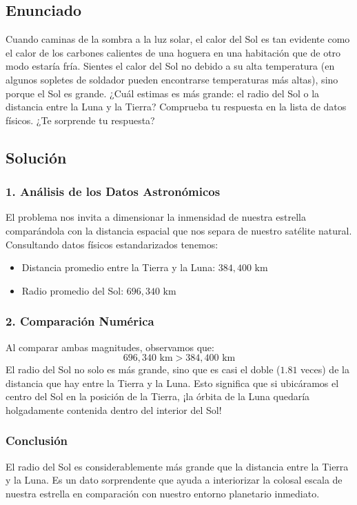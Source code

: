 \documentclass[12pt, a4paper]{article}
\begin{document}
\newpage

\subsection*{Enunciado}
Cuando caminas de la sombra a la luz solar, el calor del Sol es tan evidente como el calor de los carbones calientes de una hoguera en una habitación que de otro modo estaría fría. Sientes el calor del Sol no debido a su alta temperatura (en algunos sopletes de soldador pueden encontrarse temperaturas más altas), sino porque el Sol es grande. ¿Cuál estimas es más grande: el radio del Sol o la distancia entre la Luna y la Tierra? Comprueba tu respuesta en la lista de datos físicos. ¿Te sorprende tu respuesta?

\subsection*{Solución}

\subsubsection*{1. Análisis de los Datos Astronómicos}
El problema nos invita a dimensionar la inmensidad de nuestra estrella comparándola con la distancia espacial que nos separa de nuestro satélite natural. Consultando datos físicos estandarizados tenemos:
\begin{itemize}
    \item Distancia promedio entre la Tierra y la Luna: $384,400 \text{ km}$
    \item Radio promedio del Sol: $696,340 \text{ km}$
\end{itemize}

\subsubsection*{2. Comparación Numérica}
Al comparar ambas magnitudes, observamos que:
$$ 696,340 \text{ km} > 384,400 \text{ km} $$
El radio del Sol no solo es más grande, sino que es casi el doble ($1.81$ veces) de la distancia que hay entre la Tierra y la Luna. Esto significa que si ubicáramos el centro del Sol en la posición de la Tierra, ¡la órbita de la Luna quedaría holgadamente contenida dentro del interior del Sol!

\subsubsection*{Conclusión}
El radio del Sol es considerablemente más grande que la distancia entre la Tierra y la Luna. Es un dato sorprendente que ayuda a interiorizar la colosal escala de nuestra estrella en comparación con nuestro entorno planetario inmediato.
\end{document}
